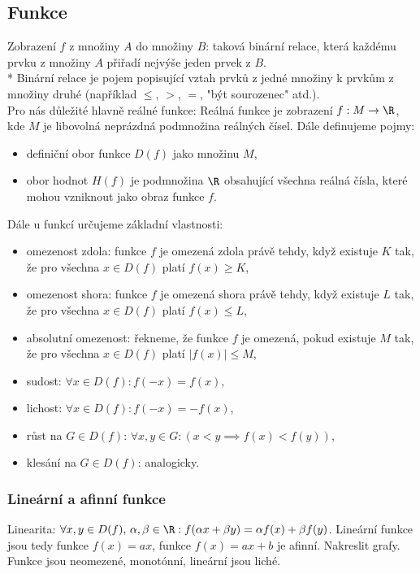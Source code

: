 \documentclass[11pt,a4paper]{article}
\begin{document}
        \subsection*{Funkce}

            Zobrazení $f$ z množiny $A$ do množiny $B$: taková binární relace, která každému prvku z množiny $A$ přiřadí nejvýše jeden prvek z $B$.\\
            * Binární relace je pojem popisující vztah prvků z jedné množiny k prvkům z množiny druhé (například $\leq$, $>$, $=$, "být sourozenec" atd.).\\
            Pro nás důležité hlavně reálné funkce: Reálná funkce je zobrazení $f: M \to \R$, kde $M$ je libovolná neprázdná podmnožina reálných čísel. Dále definujeme pojmy:
            \begin{itemize}
                \item definiční obor funkce $D(f)$ jako množinu $M$,
                \item obor hodnot $H(f)$ je podmnožina $\R$ obsahující všechna reálná čísla, které mohou vzniknout jako obraz funkce $f$.
            \end{itemize}

            \noindent
            Dále u funkcí určujeme základní vlastnosti:
            \begin{itemize}
                \item omezenost zdola: funkce $f$ je omezená zdola právě tehdy, když existuje $K$ tak, že pro všechna $x \in D(f)$ platí $f(x) \geq K$,
                \item omezenost shora: funkce $f$ je omezená shora právě tehdy, když existuje $L$ tak, že pro všechna $x \in D(f)$ platí $f(x) \leq L$,
                \item absolutní omezenost: řekneme, že funkce $f$ je omezená, pokud existuje $M$ tak, že pro všechna $x \in D(f)$ platí $|f(x)| \leq M$,
                \item sudost: $\forall x \in D(f) : f(-x) = f(x)$,
                \item lichost: $\forall x \in D(f) : f(-x) = -f(x)$,
                \item růst na $G \in D(f)$: $\forall x,y \in G : (x < y \implies f(x) < f(y))$,
                \item klesání na $G \in D(f)$: analogicky.
            \end{itemize}

            \subsubsection*{Lineární a afinní funkce}
                Linearita: $\forall x,y \in D(f), \, \alpha,\beta \in \R : f(\alpha x + \beta y) = \alpha f(x) + \beta f(y)$.
                Lineární funkce jsou tedy funkce $f(x) = ax$, funkce $f(x) = ax + b$ je afinní. Nakreslit grafy. Funkce jsou neomezené, monotónní, lineární jsou liché.
\end{document}

